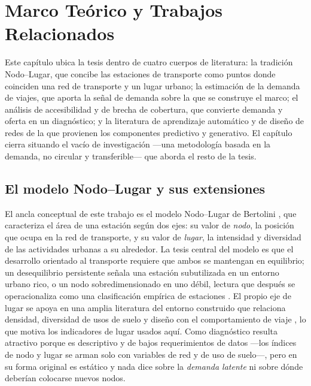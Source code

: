 \chapter{Marco Teórico y Trabajos Relacionados}
\label{ch:marco}

Este capítulo ubica la tesis dentro de cuatro cuerpos de literatura: la tradición
Nodo--Lugar, que concibe las estaciones de transporte como puntos donde coinciden una red
de transporte y un lugar urbano; la estimación de la demanda de viajes, que aporta la
señal de demanda sobre la que se construye el marco; el análisis de accesibilidad y de
brecha de cobertura, que convierte demanda y oferta en un diagnóstico; y la literatura de
aprendizaje automático y de diseño de redes de la que provienen los componentes
predictivo y generativo. El capítulo cierra situando el vacío de investigación ---una
metodología basada en la demanda, no circular y transferible--- que aborda el resto de la
tesis.

\section{El modelo Nodo--Lugar y sus extensiones}
\label{sec:marco-nodolugar}

El ancla conceptual de este trabajo es el modelo Nodo--Lugar de Bertolini
\parencite{bertolini1996, bertolini1999}, que caracteriza el área de una estación según
dos ejes: su valor de \emph{nodo}, la posición que ocupa en la red de transporte, y su
valor de \emph{lugar}, la intensidad y diversidad de las actividades urbanas a su
alrededor. La tesis central del modelo es que el desarrollo orientado al transporte
requiere que ambos se mantengan en equilibrio; un desequilibrio persistente señala una
estación subutilizada en un entorno urbano rico, o un nodo sobredimensionado en uno débil,
lectura que después se operacionaliza como una clasificación empírica de estaciones
\parencite{reusser2008, vale2015}. El propio eje de lugar se apoya en una amplia literatura
del entorno construido que relaciona densidad, diversidad de usos de suelo y diseño con el
comportamiento de viaje \parencite{cervero1997threeD, ewing2010meta}, lo que motiva los
indicadores de lugar usados aquí. Como diagnóstico resulta atractivo porque es descriptivo
y de bajos requerimientos de datos ---los índices de nodo y lugar se arman solo con
variables de red y de uso de suelo---, pero en su forma original es estático y nada dice
sobre la \emph{demanda latente} ni sobre dónde deberían colocarse nuevos nodos.

